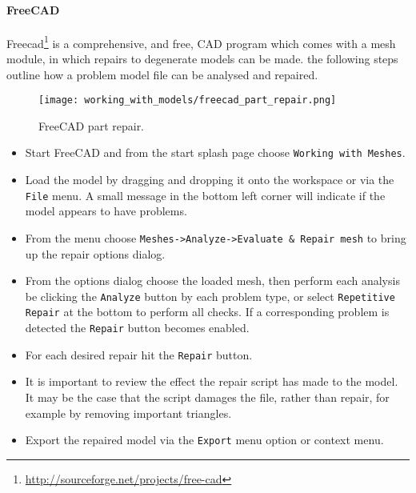 {}

\paragraph{FreeCAD} %
\label{par:freecad}

Freecad\footnote{\url{http://sourceforge.net/projects/free-cad}} is a comprehensive, and free, CAD program which comes with a mesh module, in which repairs to degenerate models can be made.  the following steps outline how a problem model file can be analysed and repaired.

\begin{figure}[H]
\centering
\texttt{[image: working\_with\_models/freecad\_part\_repair.png]}
\caption{FreeCAD part repair.}
\label{fig:freecad_part_repair}
\end{figure}

\begin{itemize}
	\item Start FreeCAD and from the start splash page choose \texttt{Working with Meshes}.
	\item Load the model by dragging and dropping it onto the workspace or via the \texttt{File} menu.  A small message in the bottom left corner will indicate if the model appears to have problems.
	\item From the menu choose \texttt{Meshes->Analyze->Evaluate \& Repair mesh} to bring up the repair options dialog.
	\item From the options dialog choose the loaded mesh, then perform each analysis be clicking the \texttt{Analyze} button by each problem type, or select \texttt{Repetitive Repair} at the bottom to perform all checks.  If a corresponding problem is detected the \texttt{Repair} button becomes enabled.
	\item For each desired repair hit the \texttt{Repair} button.
	\item It is important to review the effect the repair script has made to the model.  It may be the case that the script damages the file, rather than repair, for example by removing important triangles.
	\item Export the repaired model via the \texttt{Export} menu option or context menu.
\end{itemize}

